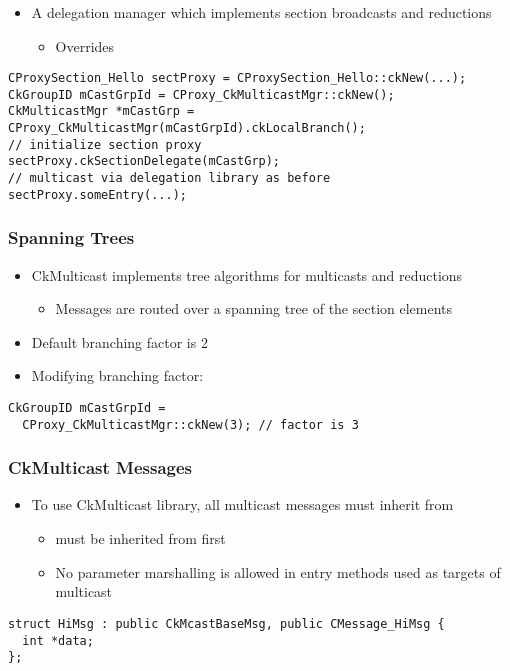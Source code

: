 \begin{frame}[fragile]
\frametitle{}
\begin{itemize}
\item A delegation manager which implements section broadcasts and reductions
  \begin{itemize}
  \item Overrides 
  \end{itemize}
\end{itemize}

\begin{lstlisting}
CProxySection_Hello sectProxy = CProxySection_Hello::ckNew(...);
CkGroupID mCastGrpId = CProxy_CkMulticastMgr::ckNew();
CkMulticastMgr *mCastGrp = CProxy_CkMulticastMgr(mCastGrpId).ckLocalBranch();
// initialize section proxy
sectProxy.ckSectionDelegate(mCastGrp);
// multicast via delegation library as before
sectProxy.someEntry(...); 
\end{lstlisting}
\end{frame}

\begin{frame}[fragile]
\frametitle{Spanning Trees}
\begin{itemize}
\item CkMulticast implements tree algorithms for multicasts and reductions
  \begin{itemize}
  \item Messages are routed over a spanning tree of the section elements
  \end{itemize}
\item Default branching factor is 2
\item Modifying branching factor:
\end{itemize}

\begin{lstlisting}
CkGroupID mCastGrpId = 
  CProxy_CkMulticastMgr::ckNew(3); // factor is 3
\end{lstlisting}
\end{frame}

\begin{frame}[fragile]
\frametitle{CkMulticast Messages}
\begin{itemize}
\item To use CkMulticast library, all multicast messages must inherit from
  \begin{itemize}
  \item {} must be inherited from first
  \item No parameter marshalling is allowed in entry methods used as targets of
    multicast
  \end{itemize}
\end{itemize}

\begin{lstlisting}
struct HiMsg : public CkMcastBaseMsg, public CMessage_HiMsg {
  int *data;
};
\end{lstlisting}
\end{frame}

